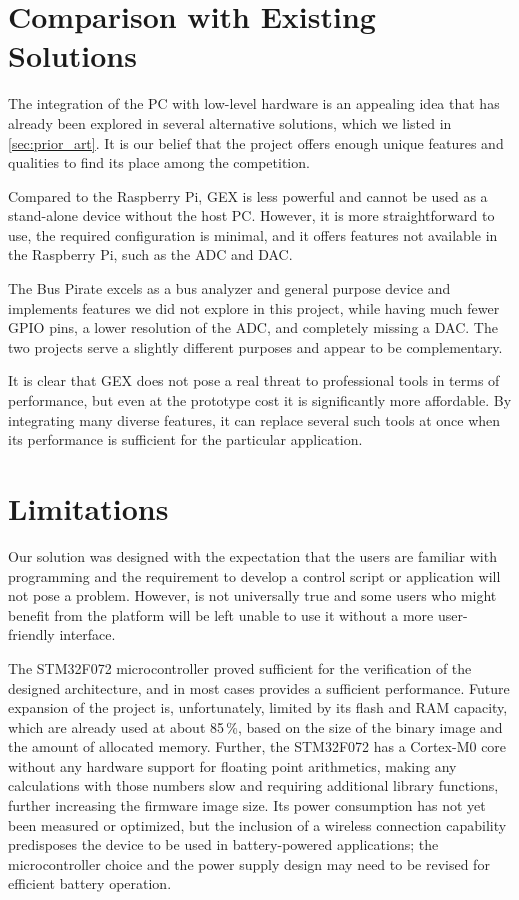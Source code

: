 \section{Comparison with Existing Solutions}

The integration of the \gls{PC} with low-level hardware is an appealing idea that has already been explored in several alternative solutions, which we listed in \cref{sec:prior_art}. It is our belief that the project offers enough unique features and qualities to find its place among the competition.

Compared to the Raspberry Pi, GEX is less powerful and cannot be used as a stand-alone device without the host \gls{PC}. However, it is more straightforward to use, the required configuration is minimal, and it offers features not available in the Raspberry Pi, such as the \gls{ADC} and \gls{DAC}.

The Bus Pirate excels as a bus analyzer and general purpose device and implements features we did not explore in this project, while having much fewer \gls{GPIO} pins, a lower resolution of the \gls{ADC}, and completely missing a \gls{DAC}. The two projects serve a slightly different purposes and appear to be complementary.

It is clear that GEX does not pose a real threat to professional tools in terms of performance, but even at the prototype cost it is significantly more affordable. By integrating many diverse features, it can replace several such tools at once when its performance is sufficient for the particular application. 

\section{Limitations}

Our solution was designed with the expectation that the users are familiar with programming and the requirement to develop a control script or application will not pose a problem. However, is not universally true and some users who might benefit from the platform will be left unable to use it without a more user-friendly interface.

The STM32F072 microcontroller proved sufficient for the verification of the designed architecture, and in most cases provides a sufficient performance. Future expansion of the project is, unfortunately, limited by its flash and \gls{RAM} capacity, which are already used at about 85\,\%, based on the size of the binary image and the amount of allocated memory. Further, the STM32F072 has a Cortex-M0 core without any hardware support for floating point arithmetics, making any calculations with those numbers slow and requiring additional library functions, further increasing the firmware image size. Its power consumption has not yet been measured or optimized, but the inclusion of a wireless connection capability predisposes the device to be used in battery-powered applications; the microcontroller choice and the power supply design may need to be revised for efficient battery operation.

